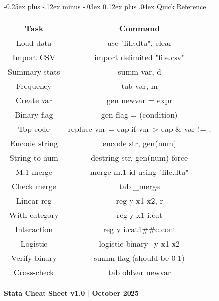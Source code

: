 ﻿\documentclass[8pt,letterpaper]{article}
\makeatletter
\renewcommand{\subsection}{\@startsection{subsection}{2}{0mm}%
                                {-0.25ex plus -.12ex minus -.03ex}%
                                {0.12ex plus .04ex}%
                                {\normalfont\fontsize{8pt}{8pt}\selectfont\bfseries\color{myblue}}}
\makeatother
\begin{document}
\begin{multicols}{2}
\subsection{Quick Reference}

\fontsize{6pt}{6.5pt}\selectfont
\noindent
\begin{tabular*}{\linewidth}{@{\extracolsep{\fill}}cc@{}}
\hline\textbf{Task} & \textbf{Command} \\
\hline
Load data & use "file.dta", clear \\
Import CSV & import delimited "file.csv" \\
Summary stats & summ var, d \\
Frequency & tab var, m \\
Create var & gen newvar = expr \\
Binary flag & gen flag = (condition) \\
Top-code & replace var = cap if var > cap \& var != . \\
Encode string & encode str, gen(num) \\
String to num & destring str, gen(num) force \\
M:1 merge & merge m:1 id using "file.dta" \\
Check merge & tab \_merge \\
Linear reg & reg y x1 x2, r \\
With category & reg y x1 i.cat \\
Interaction & reg y i.cat1\#\#c.cont \\
Logistic & logistic binary\_y x1 x2 \\
Verify binary & summ flag (should be 0-1) \\
Cross-check & tab oldvar newvar \\
\hline
\end{tabular*}
\normalsize

\vspace{0.1cm}
{\fontsize{5pt}{6pt}\selectfont \textbf{Stata Cheat Sheet v1.0 | October 2025}}

\end{multicols}
\end{document}
